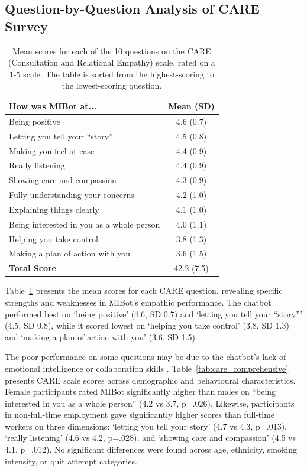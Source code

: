 \subsection*{Question-by-Question Analysis of CARE Survey}
\begin{table}[ht]
  \centering
  \small
  \setlength{\tabcolsep}{3pt}
  \renewcommand{\arraystretch}{1.1}
  \begin{tabular}{@{}lc@{}}
    \toprule
    \textbf{How was MIBot at...} & \textbf{Mean (SD)} \\
    \midrule
    Being positive & 4.6 (0.7) \\
    Letting you tell your ``story'' & 4.5 (0.8) \\
    Making you feel at ease & 4.4 (0.9) \\
    Really listening & 4.4 (0.9) \\
    Showing care and compassion & 4.3 (0.9) \\
    Fully understanding your concerns & 4.2 (1.0) \\
    Explaining things clearly & 4.1 (1.0) \\
    Being interested in you as a whole person & 4.0 (1.1) \\
    Helping you take control & 3.8 (1.3) \\
    Making a plan of action with you & 3.6 (1.5) \\
    \midrule
    \textbf{Total Score} & 42.2 (7.5) \\
    \bottomrule
  \end{tabular}
  \caption[Mean CARE Scores per Question]{Mean scores for each of the 10 questions on the CARE (Consultation and Relational Empathy) scale, rated on a 1-5 scale. The table is sorted from the highest-scoring to the lowest-scoring question.}
  \label{table:care_question_means}
\end{table}
Table~\ref{table:care_question_means} presents the mean scores for each CARE question, revealing specific strengths and weaknesses in MIBot's empathic performance. The chatbot performed best on `being positive' (4.6, SD 0.7) and `letting you tell your ``story''' (4.5, SD 0.8), while it scored lowest on `helping you take control' (3.8, SD 1.3) and `making a plan of action with you' (3.6, SD 1.5).


The poor performance on some questions may be due to the chatbot's lack of emotional intelligence \citep{sabour-etal-2024-emobench} or collaboration skills \citep{yang-etal-2024-human}. Table~\ref{tab:care_comprehensive} presents CARE scale scores across demographic and behavioural characteristics. Female participants rated MIBot significantly higher than males on ``being interested in you as a whole person'' (4.2 vs 3.7, p=.026). Likewise, participants in non-full-time employment gave significantly higher scores than full-time workers on three dimensions: `letting you tell your story' (4.7 vs 4.3, p=.013), `really listening' (4.6 vs 4.2, p=.028), and `showing care and compassion' (4.5 vs 4.1, p=.012). No significant differences were found across age, ethnicity, smoking intensity, or quit attempt categories.







